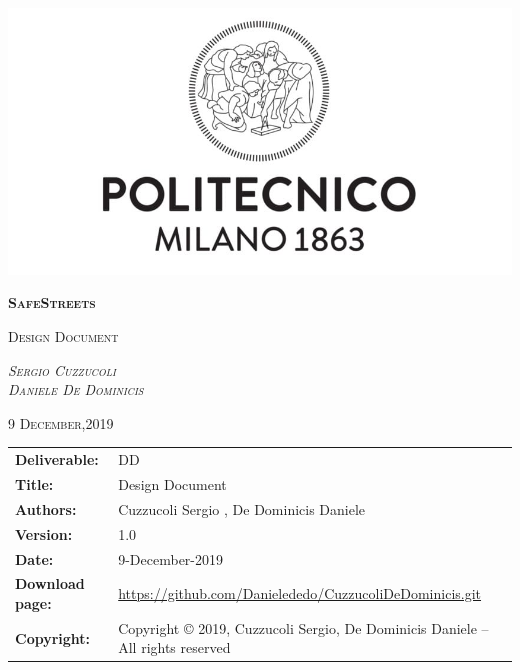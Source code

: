 




\begin{titlepage}
	\centering
	\includegraphics[width=\textwidth]{Images/PolimiLogo}\par\vspace{1cm}
	{\scshape\Huge\textbf{SafeStreets}\par}
	\vspace{1cm}
	{\scshape\Large Design Document\par}
	\vspace{2cm}
	{\scshape\Large\emph{Sergio Cuzzucoli}\\ \emph{Daniele De Dominicis}\par}
	\vspace{4cm}
	{\scshape\normalsize{9 December,2019}}
\end{titlepage}

\begin{table}[h!]
\begin{tabu} to \textwidth { X[0.3,r,p] X[0.7,l,p] }
\hline

\textbf{Deliverable:} & DD\\
\textbf{Title:} & Design Document \\
\textbf{Authors:} & Cuzzucoli Sergio , De Dominicis Daniele \\
\textbf{Version:} & 1.0 \\ 
\textbf{Date:} & 9-December-2019  \\
\textbf{Download page:} & \href{https://github.com/Danielededo/CuzzucoliDeDominicis.git}{https://github.com/Danielededo/CuzzucoliDeDominicis.git} \\
\textbf{Copyright:} & Copyright © 2019, Cuzzucoli Sergio, De Dominicis Daniele – All rights reserved \\
\hline
\end{tabu}
\end{table}

